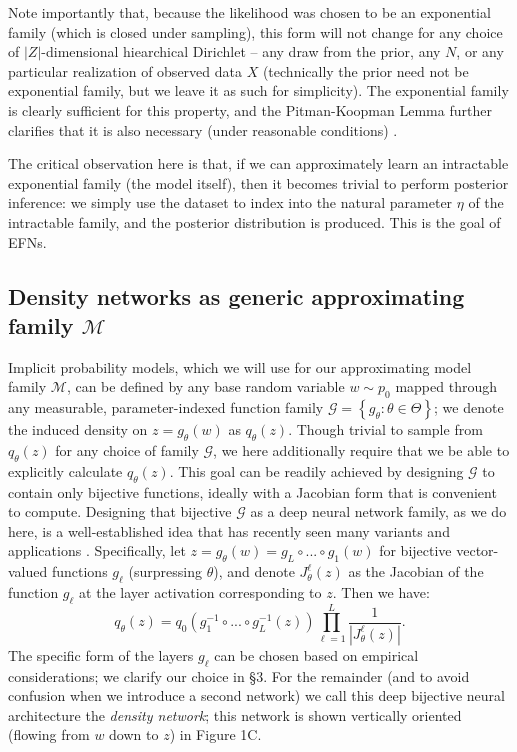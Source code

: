\documentclass[twoside]{article}
\begin{document}
Note importantly that, because the likelihood was chosen to be an exponential family (which is closed under sampling), this form will not change for any choice of $|Z|$-dimensional hiearchical Dirichlet -- any draw from the prior, any $N$, or any particular realization of observed data $X$ (technically the prior need not be exponential family, but we leave it as such for simplicity).  
The exponential family is clearly sufficient for this property, and the Pitman-Koopman Lemma further clarifies that it is also necessary (under reasonable conditions) \citep[\S3.3.3]{robert2007bayesian}.

The critical observation here is that, if we can approximately learn an intractable exponential family (the model itself), then it becomes trivial to perform posterior inference: we simply use the dataset to index into the natural parameter $\eta$ of the intractable family, and the posterior distribution is produced.  This is the goal of EFNs.

\subsection{Density networks as generic approximating family $\mathcal{M}$}

Implicit probability models, which we will use for our approximating model family $\mathcal{M}$, can be defined by any base random variable $w\sim p_0$ mapped through any measurable, parameter-indexed function family  $\mathcal{G} = \left\{g_\theta: \theta \in \Theta\right\}$; we denote the induced density on $z=g_\theta(w)$ as $q_\theta(z)$.   
Though trivial to sample from $q_\theta(z)$ for any choice of family $\mathcal{G}$, we here additionally require that we be able to explicitly calculate $q_\theta(z)$.  
This goal can be readily achieved by designing $\mathcal{G}$ to contain only bijective functions, ideally with a Jacobian form that is convenient to compute. %
Designing that bijective $\mathcal{G}$ as a deep neural network family, as we do here, is a well-established idea that has recently seen many variants and applications \citep{mackay1997density, baird2005one, tabak2010density, rippel2013high, uria2013rnade, rezende2015variational, dinh2016density, papamakarios2017masked, jacobsen2018revnet}.  Specifically, let $z = g_\theta(w) = g_L \circ ... \circ g_1(w)$ for bijective vector-valued functions $g_\ell$ (surpressing $\theta$), and denote $J^\ell_\theta(z)$ as the Jacobian of the function $g_\ell$ at the layer activation corresponding to $z$.  Then we have:
%
{\small 
\begin{equation}
q_\theta(z) = q_0\left( g_1^{-1} \circ ... \circ g_L^{-1}(z) \right) \prod_{\ell=1}^L \frac{1}{| J^\ell_\theta(z) |}.
\label{eq:4}
\end{equation}}
%
The specific form of the layers $g_\ell$ can be chosen based on empirical considerations; we clarify our choice in \S3.  For the remainder (and to avoid confusion when we introduce a second network) we call this deep bijective neural architecture the \emph{density network}; this network is shown vertically oriented (flowing from $w$ down to $z$) in Figure 1C.
\end{document}
